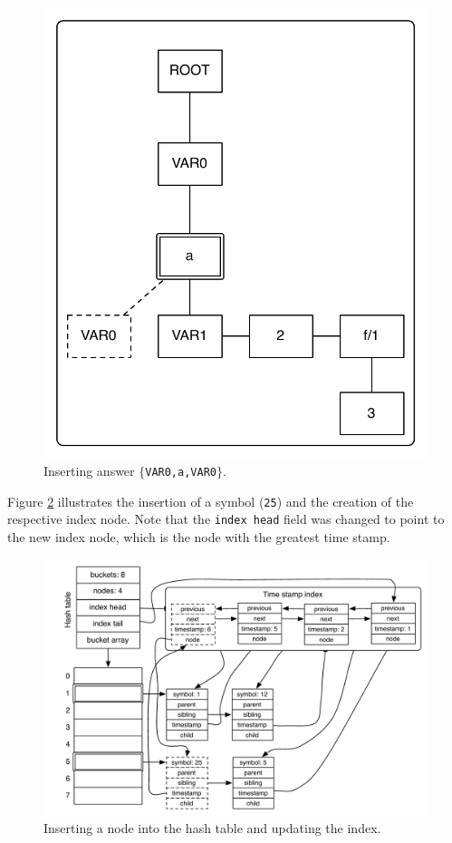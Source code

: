 \begin{figure}[ht]
  \centering
    \includegraphics[scale=0.45]{tst_insert.pdf}
  \caption{Inserting answer $\{$\texttt{VAR0,a,VAR0}$\}$.}
  \label{fig:tst_chain_insert}
\end{figure}

Figure \ref{fig:hash_table_insert}
illustrates the insertion of a symbol (\texttt{25}) and the creation of the respective
index node. Note that the \texttt{index head} field was changed to point to the new index node, which
is the node with the greatest time stamp.


\begin{figure}[ht]
  \centering
    \includegraphics[scale=0.6]{hash_table_insert.pdf}
  \caption{Inserting a node into the hash table and updating the index.}
  \label{fig:hash_table_insert}
\end{figure}

